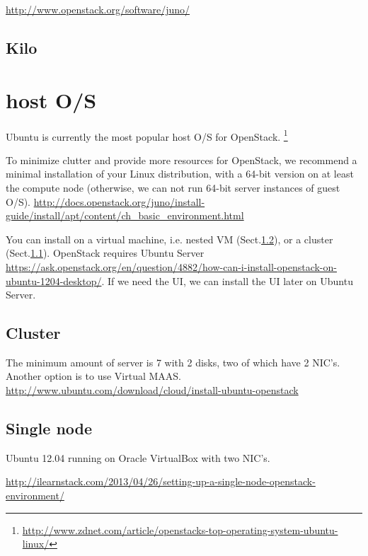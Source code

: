 \url{http://www.openstack.org/software/juno/}
\subsection{Kilo}


\section{host O/S}
\label{sec:OpenStack_host-OS}

Ubuntu is currently the most popular host O/S for OpenStack.
\footnote{\url{http://www.zdnet.com/article/openstacks-top-operating-system-ubuntu-linux/}}

To minimize clutter and provide more resources for OpenStack, we recommend a
minimal installation of your Linux distribution, with a 64-bit version on at
least the compute node (otherwise, we can not run 64-bit server instances of
guest O/S).
\url{http://docs.openstack.org/juno/install-guide/install/apt/content/ch_basic_environment.html}

You can install on a virtual machine, i.e. nested VM
(Sect.\ref{sec:OpenStack_single-node}), or a cluster
(Sect.\ref{sec:OpenStack_cluster}). OpenStack requires Ubuntu Server
\url{https://ask.openstack.org/en/question/4882/how-can-i-install-openstack-on-ubuntu-1204-desktop/}.
If we need the UI, we can install the UI later on Ubuntu Server.


\subsection{Cluster}
\label{sec:OpenStack_cluster}

The minimum amount of server is 7 with 2 disks, two of which have 2 NIC's.
Another option is to use Virtual MAAS.
\url{http://www.ubuntu.com/download/cloud/install-ubuntu-openstack}

\subsection{Single node}
\label{sec:OpenStack_single-node}

Ubuntu 12.04 running on Oracle VirtualBox with two NIC's.

\url{http://ilearnstack.com/2013/04/26/setting-up-a-single-node-openstack-environment/}



